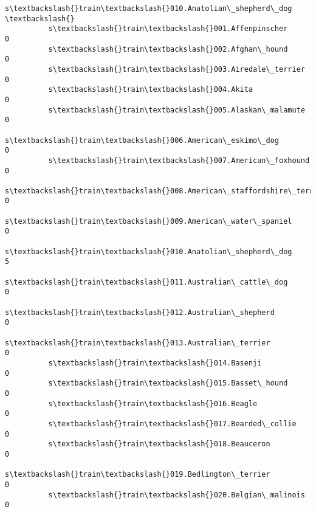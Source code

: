 \documentclass[11pt]{article}
\begin{document}
\begin{Verbatim}[commandchars=\\\{\}]
                                                          s\textbackslash{}train\textbackslash{}010.Anatolian\_shepherd\_dog  \textbackslash{}
          s\textbackslash{}train\textbackslash{}001.Affenpinscher                                                        0   
          s\textbackslash{}train\textbackslash{}002.Afghan\_hound                                                         0   
          s\textbackslash{}train\textbackslash{}003.Airedale\_terrier                                                     0   
          s\textbackslash{}train\textbackslash{}004.Akita                                                                0   
          s\textbackslash{}train\textbackslash{}005.Alaskan\_malamute                                                     0   
          s\textbackslash{}train\textbackslash{}006.American\_eskimo\_dog                                                  0   
          s\textbackslash{}train\textbackslash{}007.American\_foxhound                                                    0   
          s\textbackslash{}train\textbackslash{}008.American\_staffordshire\_terrier                                       0   
          s\textbackslash{}train\textbackslash{}009.American\_water\_spaniel                                               0   
          s\textbackslash{}train\textbackslash{}010.Anatolian\_shepherd\_dog                                               5   
          s\textbackslash{}train\textbackslash{}011.Australian\_cattle\_dog                                                0   
          s\textbackslash{}train\textbackslash{}012.Australian\_shepherd                                                  0   
          s\textbackslash{}train\textbackslash{}013.Australian\_terrier                                                   0   
          s\textbackslash{}train\textbackslash{}014.Basenji                                                              0   
          s\textbackslash{}train\textbackslash{}015.Basset\_hound                                                         0   
          s\textbackslash{}train\textbackslash{}016.Beagle                                                               0   
          s\textbackslash{}train\textbackslash{}017.Bearded\_collie                                                       0   
          s\textbackslash{}train\textbackslash{}018.Beauceron                                                            0   
          s\textbackslash{}train\textbackslash{}019.Bedlington\_terrier                                                   0   
          s\textbackslash{}train\textbackslash{}020.Belgian\_malinois                                                     0   

\end{Verbatim}
\end{document}
